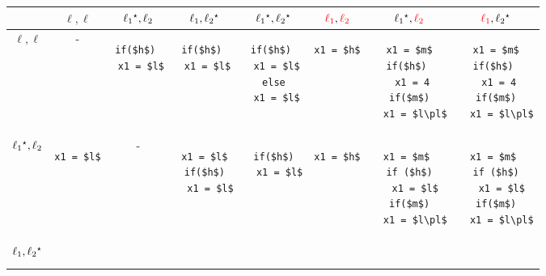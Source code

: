 \lstset{numbers=none}
\begin{table*}
\centering
\begin{tabular} {|c|c|c|c|c|c|c|c|}
\hline
 & $\ell, \ell$ & $\ell_1{}^\star, \ell_2 $ & $\ell_1, \ell_2{}^\star$ &
 $\ell_1{}^\star, \ell_2{}^\star $& $\textcolor{red}{\ell_1},
 \textcolor{red}{\ell_2}$ & $\ell_1 {}^\star,
 \textcolor{red}{\ell_2}$& 
 $\textcolor{red}{\ell_1}, \ell_2 {}^\star$ \\
\hline
$\ell, \ell$ & 
-
&
\begin{lstlisting}
if($h$) 
 x1 = $l$
\end{lstlisting} & 
\begin{lstlisting}
if($h$) 
 x1 = $l$
\end{lstlisting} & 
\begin{lstlisting}
if($h$) 
 x1 = $l$
else
 x1 = $l$
\end{lstlisting} 
& 
\begin{lstlisting}
x1 = $h$
\end{lstlisting} 
& 
\begin{lstlisting}
x1 = $m$
if($h$) 
 x1 = 4
if($m$)
  x1 = $l\pl$
\end{lstlisting} 
& 
\begin{lstlisting}
x1 = $m$
if($h$) 
 x1 = 4
if($m$)
  x1 = $l\pl$
\end{lstlisting} 
\\
\hline
$\ell_1{}^\star, \ell_2$ & 
\begin{lstlisting}
x1 = $l$
\end{lstlisting} & 
- & 
\begin{lstlisting}
x1 = $l$
if($h$)
  x1 = $l$
\end{lstlisting} & 
\begin{lstlisting}
if($h$)
  x1 = $l$
\end{lstlisting} & 
\begin{lstlisting}
x1 = $h$
\end{lstlisting} & 
\begin{lstlisting}
x1 = $m$ 
if ($h$)
  x1 = $l$
if($m$)
  x1 = $l\pl$
\end{lstlisting} & 
\begin{lstlisting}
x1 = $m$ 
if ($h$)
  x1 = $l$
if($m$)
  x1 = $l\pl$
\end{lstlisting} \\
\hline
$\ell_1, \ell_2{}^\star$ &
\begin{lstlisting}

\end{lstlisting}
\end{tabular}
\end{table*}
